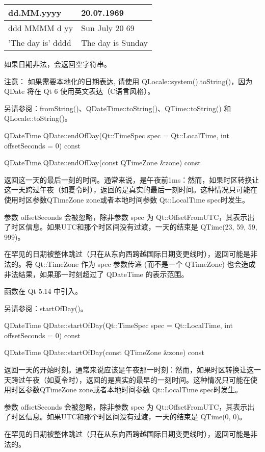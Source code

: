 \begin{tabular}{|l|l|}
\hline
dd.MM.yyyy	&20.07.1969\\
\hline
ddd MMMM d yy&	Sun July 20 69\\
\hline
'The day is' dddd&	The day is Sunday\\
\hline
\end{tabular}

如果日期非法，会返回空字符串。

注意： 如果需要本地化的日期表达, 请使用 QLocale::system().toString()，因为 QDate 将在 Qt 6 使用英文表达（C语言风格）。

另请参阅：fromString()、QDateTime::toString()、QTime::toString() 和
QLocale::toString()。

\splitLine

QDateTime QDate::endOfDay(Qt::TimeSpec spec = Qt::LocalTime, int offsetSeconds = 0) const

QDateTime QDate::endOfDay(const QTimeZone \&zone) const

返回这一天的最后一刻的时间。通常来说，是午夜前1ms：然而，如果时区转换让这一天跨过午夜（如夏令时），返回的是真实的最后一刻时间。这种情况只可能在使用时区参数QTimeZone zone或者本地时间参数 Qt::LocalTime spec时发生。

参数 offsetSeconds 会被忽略，除非参数 spec 为 Qt::OffsetFromUTC，其表示出了时区信息。如果UTC和那个时区间没有过渡，一天的结束是 QTime(23, 59, 59, 999)。

在罕见的日期被整体跳过（只在从东向西跨越国际日期变更线时），返回可能是非法的。将 Qt::TimeZone 作为 spec 参数传递 (而不是一个 QTimeZone) 也会造成非法结果，如果那一时刻超过了 QDateTime 的表示范围。

函数在 Qt 5.14 中引入。

另请参阅：startOfDay()。

\splitLine

QDateTime QDate::startOfDay(Qt::TimeSpec spec = Qt::LocalTime, int offsetSeconds = 0) const

QDateTime QDate::startOfDay(const QTimeZone \&zone) const

返回一天的开始时刻。通常来说应该是午夜那一时刻：然而，如果时区转换让这一天跨过午夜（如夏令时），返回的是真实的最早的一刻时间。这种情况只可能在使用时区参数QTimeZone zone或者本地时间参数 Qt::LocalTime spec时发生。

参数 offsetSeconds 会被忽略，除非参数 spec 为 Qt::OffsetFromUTC，其表示出了时区信息。如果UTC和那个时区间没有过渡，一天的结束是 QTime(0, 0)。

在罕见的日期被整体跳过（只在从东向西跨越国际日期变更线时），返回可能是非法的。

